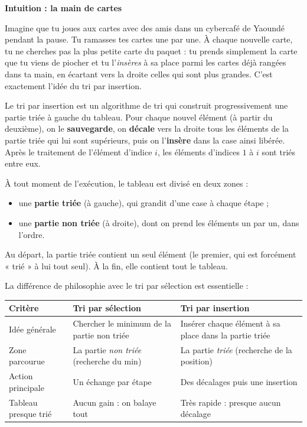 \documentclass[11pt]{article}
\newcommand{\cle}[1]{{\popxbold\color{popdark}#1}}
\newcounter{popsec}
\newcounter{popsub}
\newcommand{\courssub}[1]{%
  \stepcounter{popsub}%
  \par\vspace{9pt}\noindent{\popxbold\fontsize{11.5}{13}\selectfont\color{popink}{\color{poporange}\thepopsec.\thepopsub}\hspace{6pt}#1}\par\nopagebreak\vspace{4pt}
}
\begin{document}
\courssub{Principe du tri par insertion}

\textbf{Intuition : la main de cartes}

Imagine que tu joues aux cartes avec des amis dans un cybercafé de Yaoundé pendant la pause. Tu ramasses tes cartes une par une. À chaque nouvelle carte, tu ne cherches pas la plus petite carte du paquet : tu prends simplement la carte que tu viens de piocher et tu l'\emph{insères} à sa place parmi les cartes déjà rangées dans ta main, en écartant vers la droite celles qui sont plus grandes. C'est exactement l'idée du tri par insertion.

\begin{definition}
Le \cle{tri par insertion} est un algorithme de tri qui construit progressivement une partie triée à gauche du tableau. Pour chaque nouvel élément (à partir du deuxième), on le \textbf{sauvegarde}, on \textbf{décale} vers la droite tous les éléments de la partie triée qui lui sont supérieurs, puis on l'\textbf{insère} dans la case ainsi libérée. Après le traitement de l'élément d'indice $i$, les éléments d'indices $1$ à $i$ sont triés entre eux.
\end{definition}

\begin{propriete}
À tout moment de l'exécution, le tableau est divisé en deux zones :
\begin{itemize}
\item une \textbf{partie triée} (à gauche), qui grandit d'une case à chaque étape ;
\item une \textbf{partie non triée} (à droite), dont on prend les éléments un par un, dans l'ordre.
\end{itemize}
Au départ, la partie triée contient un seul élément (le premier, qui est forcément « trié » à lui tout seul). À la fin, elle contient tout le tableau.
\end{propriete}

La différence de philosophie avec le tri par sélection est essentielle :

\begin{center}
\begin{tabularx}{\linewidth}{|l|X|X|}
\hline
\rowcolor{popblueL} \textbf{Critère} & \textbf{Tri par sélection} & \textbf{Tri par insertion} \\
\hline
Idée générale & Chercher le minimum de la partie non triée & Insérer chaque élément à sa place dans la partie triée \\
\hline
Zone parcourue & La partie \emph{non triée} (recherche du min) & La partie \emph{triée} (recherche de la position) \\
\hline
Action principale & Un échange par étape & Des décalages puis une insertion \\
\hline
Tableau presque trié & Aucun gain : on balaye tout & Très rapide : presque aucun décalage \\
\hline
\end{tabularx}
\end{center}
\end{document}

